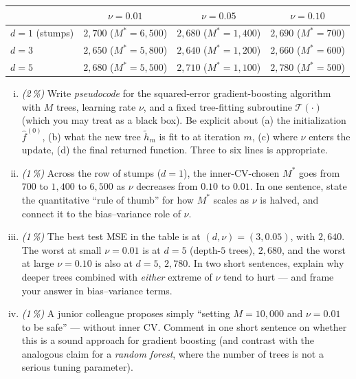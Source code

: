 \documentclass[11pt,a4paper]{article}
\newcommand{\subpoints}[1]{\textit{(#1\,\%)}}
\begin{document}
\begin{center}\small
\begin{tabular}{lccc}
\toprule
                       & $\nu = 0.01$        & $\nu = 0.05$        & $\nu = 0.10$        \\
\midrule
$d = 1$ (stumps)       & $2{,}700$ ($M^* = 6{,}500$) & $2{,}680$ ($M^* = 1{,}400$) & $2{,}690$ ($M^* = 700$) \\
$d = 3$                & $2{,}650$ ($M^* = 5{,}800$) & $2{,}640$ ($M^* = 1{,}200$) & $2{,}660$ ($M^* = 600$) \\
$d = 5$                & $2{,}680$ ($M^* = 5{,}500$) & $2{,}710$ ($M^* = 1{,}100$) & $2{,}780$ ($M^* = 500$) \\
\bottomrule
\end{tabular}
\end{center}

\begin{enumerate}[(i)]
  \item \subpoints{2} Write \emph{pseudocode} for the squared-error gradient-boosting algorithm with $M$ trees, learning rate $\nu$, and a fixed tree-fitting subroutine $\mathcal{T}(\cdot)$ (which you may treat as a black box). Be explicit about (a) the initialization $\hat f^{(0)}$, (b) what the new tree $\widetilde h_m$ is fit to at iteration $m$, (c) where $\nu$ enters the update, (d) the final returned function. Three to six lines is appropriate.
  \item \subpoints{1} Across the row of stumps ($d = 1$), the inner-CV-chosen $M^*$ goes from $700$ to $1{,}400$ to $6{,}500$ as $\nu$ decreases from $0.10$ to $0.01$. In one sentence, state the quantitative ``rule of thumb'' for how $M^*$ scales as $\nu$ is halved, and connect it to the bias--variance role of $\nu$.
  \item \subpoints{1} The best test MSE in the table is at $(d, \nu) = (3, 0.05)$, with $2{,}640$. The worst at small $\nu = 0.01$ is at $d = 5$ (depth-$5$ trees), $2{,}680$, and the worst at large $\nu = 0.10$ is also at $d = 5$, $2{,}780$. In two short sentences, explain why deeper trees combined with \emph{either} extreme of $\nu$ tend to hurt --- and frame your answer in bias--variance terms.
  \item \subpoints{1} A junior colleague proposes simply ``setting $M = 10{,}000$ and $\nu = 0.01$ to be safe'' --- without inner CV. Comment in one short sentence on whether this is a sound approach for gradient boosting (and contrast with the analogous claim for a \emph{random forest}, where the number of trees is not a serious tuning parameter).
\end{enumerate}
\end{document}
